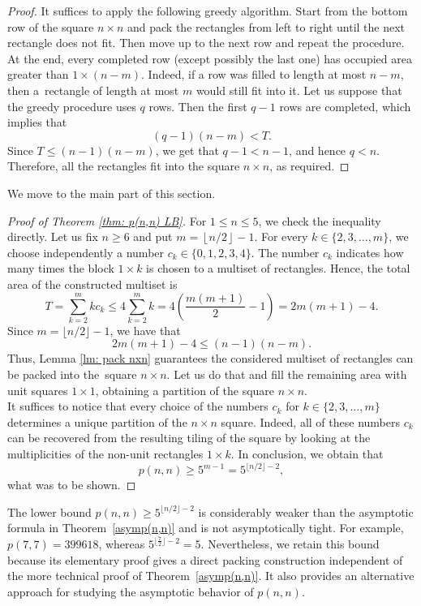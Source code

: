 \documentclass[12pt,a4paper]{amsart}
\numberwithin{equation}{section}
\theoremstyle{plain}
\theoremstyle{definition}
\theoremstyle{remark}
\begin{document}
\begin{proof}
It suffices to apply the following greedy algorithm. Start from the bottom row of the square $n\times n$ and pack the rectangles from left to right until the next rectangle does not fit. Then move up to the next row and repeat the procedure. %
At the end, every completed row (except possibly the last one) has occupied area greater than $1\times (n-m)$. Indeed, if a row was filled to length at most $n-m$, then a~rectangle of length at most $m$ would still fit into it.
Let us suppose that the greedy procedure uses $q$ rows. Then the first $q-1$ rows are completed, which implies that
$$
(q-1)(n-m)<T.
$$
Since $T\le  (n-1)(n-m)$, we get that $q-1<n-1$, and hence $q< n$. Therefore, all the rectangles fit into the square $n\times n$, as required.
\end{proof}
We move to the main part of this section.
\begin{proof}[Proof of Theorem \ref{thm: p(n,n) LB}] For $1\le n\le 5$, we check the inequality directly.
Let us fix $n\geq6$ and put $m=\left\lfloor n/2\right\rfloor-1$. For every $k\in\{2,3,\ldots,m\}$, we choose independently a number
$c_k\in\{0,1,2,3,4\}.$ The number $c_k$ indicates how many times the block $1\times k$ is chosen to a multiset of rectangles. Hence, the total area of the constructed multiset is
$$T=\sum_{k=2}^{m}k c_k \le  4\sum_{k=2}^{m}k = 4\left(\frac{m(m+1)}2-1\right) = 2m(m+1)-4. $$
Since $m=\lfloor n/2\rfloor-1$, we have that
$$2m(m+1)-4\le  (n-1)(n-m).$$
Thus, Lemma \ref{lm: pack nxn} guarantees the considered multiset of rectangles can be packed into the~square $n\times n$. Let us do that and fill the remaining area with unit squares $1\times1$, obtaining a partition of the square $n\times n$.\\
It suffices to notice that every choice of the numbers $c_k$ for $k\in\{2,3,\ldots,m\}$ determines a unique partition of the $n\times n$ square. Indeed, all of these numbers $c_k$ can be recovered from the resulting tiling of the square by looking at the multiplicities of the non-unit rectangles $1\times k$. In conclusion, we obtain that
$$
p(n,n)
\ge
5^{m-1}
=
5^{\lfloor n/2\rfloor-2},
$$
what was to be shown. 
\end{proof}
The lower bound $p(n,n)\geq5^{\lfloor n/2\rfloor-2}$ is considerably weaker than the asymptotic formula in Theorem~\ref{asymp(n,n)} and is not asymptotically tight. For example, $p(7,7)=399618$, whereas $5^{\lfloor \frac{7}{2}\rfloor-2}=5$. Nevertheless, we retain this bound because its elementary proof gives a direct packing construction independent of the more technical proof of Theorem~\ref{asymp(n,n)}. It also provides an alternative approach for studying the asymptotic behavior of $p(n,n)$.
\end{document}
